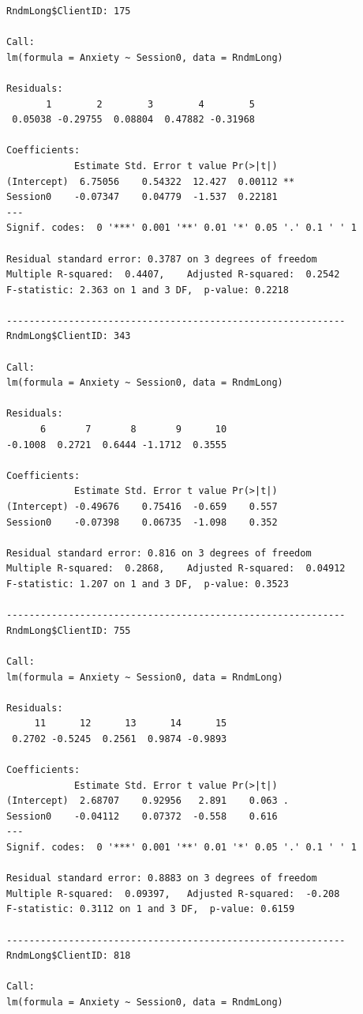 \documentclass[
  11pt,
]{book}
\begin{document}
\begin{verbatim}
RndmLong$ClientID: 175

Call:
lm(formula = Anxiety ~ Session0, data = RndmLong)

Residuals:
       1        2        3        4        5 
 0.05038 -0.29755  0.08804  0.47882 -0.31968 

Coefficients:
            Estimate Std. Error t value Pr(>|t|)   
(Intercept)  6.75056    0.54322  12.427  0.00112 **
Session0    -0.07347    0.04779  -1.537  0.22181   
---
Signif. codes:  0 '***' 0.001 '**' 0.01 '*' 0.05 '.' 0.1 ' ' 1

Residual standard error: 0.3787 on 3 degrees of freedom
Multiple R-squared:  0.4407,    Adjusted R-squared:  0.2542 
F-statistic: 2.363 on 1 and 3 DF,  p-value: 0.2218

------------------------------------------------------------ 
RndmLong$ClientID: 343

Call:
lm(formula = Anxiety ~ Session0, data = RndmLong)

Residuals:
      6       7       8       9      10 
-0.1008  0.2721  0.6444 -1.1712  0.3555 

Coefficients:
            Estimate Std. Error t value Pr(>|t|)
(Intercept) -0.49676    0.75416  -0.659    0.557
Session0    -0.07398    0.06735  -1.098    0.352

Residual standard error: 0.816 on 3 degrees of freedom
Multiple R-squared:  0.2868,    Adjusted R-squared:  0.04912 
F-statistic: 1.207 on 1 and 3 DF,  p-value: 0.3523

------------------------------------------------------------ 
RndmLong$ClientID: 755

Call:
lm(formula = Anxiety ~ Session0, data = RndmLong)

Residuals:
     11      12      13      14      15 
 0.2702 -0.5245  0.2561  0.9874 -0.9893 

Coefficients:
            Estimate Std. Error t value Pr(>|t|)  
(Intercept)  2.68707    0.92956   2.891    0.063 .
Session0    -0.04112    0.07372  -0.558    0.616  
---
Signif. codes:  0 '***' 0.001 '**' 0.01 '*' 0.05 '.' 0.1 ' ' 1

Residual standard error: 0.8883 on 3 degrees of freedom
Multiple R-squared:  0.09397,   Adjusted R-squared:  -0.208 
F-statistic: 0.3112 on 1 and 3 DF,  p-value: 0.6159

------------------------------------------------------------ 
RndmLong$ClientID: 818

Call:
lm(formula = Anxiety ~ Session0, data = RndmLong)


\end{verbatim}
\end{document}
